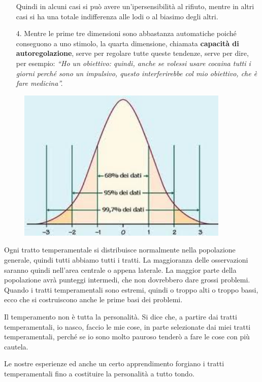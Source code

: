 \begin{itemize}
Quindi in alcuni casi si può avere un'ipersensibilità al rifiuto, mentre
in altri casi si ha una totale indifferenza alle lodi o al biasimo degli
altri.

\item[4.]
  Mentre le prime tre dimensioni sono abbastanza automatiche poiché
  conseguono a uno stimolo, la quarta dimensione, chiamata
  \textbf{capacità di autoregolazione}, serve per regolare tutte queste
  tendenze, serve per dire, per esempio: \emph{``Ho un obiettivo:
  quindi, anche se volessi usare cocaina tutti i giorni perché sono un
  impulsivo, questo interferirebbe col mio obiettivo, che è fare
  medicina''.}
\end{itemize}

\begin{figure}[!ht]
\centering
	\includegraphics[width=0.9\textwidth]{011/image2.png}
\end{figure}

Ogni
tratto temperamentale si distribuisce normalmente nella popolazione
generale, quindi tutti abbiamo tutti i tratti. La maggioranza delle
osservazioni saranno quindi nell'area centrale o appena laterale. La
maggior parte della popolazione avrà punteggi intermedi, che non
dovrebbero dare grossi problemi. Quando i tratti temperamentali sono
estremi, quindi o troppo alti o troppo bassi, ecco che si costruiscono
anche le prime basi dei problemi.

Il temperamento non è tutta la personalità. Si dice che, a partire dai
tratti temperamentali, io nasco, faccio le mie cose, in parte
selezionate dai miei tratti temperamentali, perché se io sono molto
pauroso tenderò a fare le cose con più cautela.

Le nostre esperienze ed anche un certo apprendimento forgiano i tratti
temperamentali fino a costituire la personalità a tutto tondo.

